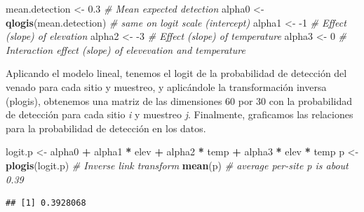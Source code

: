 \documentclass[
]{book}
\newenvironment{Shaded}{\begin{snugshade}}{\end{snugshade}}
\newcommand{\CommentTok}[1]{\textcolor[rgb]{0.56,0.35,0.01}{\textit{#1}}}
\newcommand{\DecValTok}[1]{\textcolor[rgb]{0.00,0.00,0.81}{#1}}
\newcommand{\FloatTok}[1]{\textcolor[rgb]{0.00,0.00,0.81}{#1}}
\newcommand{\KeywordTok}[1]{\textcolor[rgb]{0.13,0.29,0.53}{\textbf{#1}}}
\newcommand{\NormalTok}[1]{#1}
\newcommand{\OperatorTok}[1]{\textcolor[rgb]{0.81,0.36,0.00}{\textbf{#1}}}
\newcommand{\StringTok}[1]{\textcolor[rgb]{0.31,0.60,0.02}{#1}}
\begin{document}
\begin{Shaded}
\begin{Highlighting}[]
\NormalTok{mean.detection <-}\StringTok{ }\FloatTok{0.3}            \CommentTok{# Mean expected detection}
\NormalTok{alpha0 <-}\StringTok{ }\KeywordTok{qlogis}\NormalTok{(mean.detection) }\CommentTok{# same on logit scale (intercept)}
\NormalTok{alpha1 <-}\StringTok{ }\DecValTok{-1}                     \CommentTok{# Effect (slope) of elevation}
\NormalTok{alpha2 <-}\StringTok{ }\DecValTok{-3}                     \CommentTok{# Effect (slope) of temperature}
\NormalTok{alpha3 <-}\StringTok{ }\DecValTok{0}                      \CommentTok{# Interaction effect (slope) of elevevation and temperature}
\end{Highlighting}
\end{Shaded}

Aplicando el modelo lineal, tenemos el logit de la probabilidad de detección del venado para cada sitio y muestreo, y aplicándole la transformación inversa (plogis), obtenemos una matriz de las dimensiones 60 por 30 con la probabilidad de detección para cada sitio \emph{i} y muestreo \emph{j}. Finalmente, graficamos las relaciones para la probabilidad de detección en los datos.

\begin{Shaded}
\begin{Highlighting}[]
\NormalTok{logit.p <-}\StringTok{ }\NormalTok{alpha0 }\OperatorTok{+}\StringTok{ }\NormalTok{alpha1 }\OperatorTok{*}\StringTok{ }\NormalTok{elev }\OperatorTok{+}\StringTok{ }\NormalTok{alpha2 }\OperatorTok{*}\StringTok{ }\NormalTok{temp }\OperatorTok{+}\StringTok{ }\NormalTok{alpha3 }\OperatorTok{*}\StringTok{ }\NormalTok{elev }\OperatorTok{*}\StringTok{ }\NormalTok{temp}
\NormalTok{p <-}\StringTok{ }\KeywordTok{plogis}\NormalTok{(logit.p)             }\CommentTok{# Inverse link transform }
\KeywordTok{mean}\NormalTok{(p)                          }\CommentTok{# average per-site p is about 0.39}
\end{Highlighting}
\end{Shaded}

\begin{verbatim}
## [1] 0.3928068
\end{verbatim}
\end{document}
